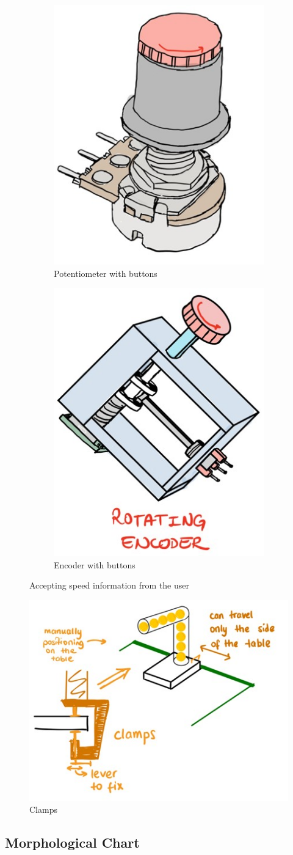 \documentclass[12pt]{article}
\begin{document}
\begin{figure}[H]
\centering
\begin{subfigure}{.3\textwidth}
  \centering
  \includegraphics[width=.3\linewidth]{potentiometer.jpg}
  \caption{Potentiometer with buttons}
  \label{fig:pot}
\end{subfigure}%
\begin{subfigure}{.3\textwidth}
  \centering
  \includegraphics[width=.3\linewidth]{encoder.jpg}
  \caption{Encoder with buttons}
  \label{fig:encoder}
\end{subfigure}

\caption{Accepting speed information from the user}
\label{fig:accept_speed}
\end{figure}

\begin{figure}[H]
\centering

  \includegraphics[width=.2\linewidth]{clamps.jpg}
  \caption{Clamps}
  \label{fig:clamp}

\end{figure}

\subsection{Morphological Chart \label{app:morpho}}
\end{document}
